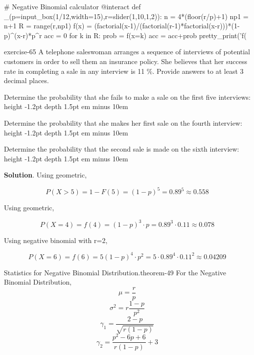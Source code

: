 \documentclass[10pt,]{book}
\newcommand{\fillin}[1]{\leavevmode\leaders\vrule height -1.2pt depth 1.5pt \hskip #1em minus #1em \null}
\numberwithin{equation}{section}
\newcommand{\gt}{>}
\begin{document}
\begin{sageinput}
# Negative Binomial calculator
@interact
def _(p=input_box(1/12,width=15),r=slider(1,10,1,2)):
    n = 4*(floor(r/p)+1)
    np1 = n+1
    R = range(r,np1)
    f(x) = (factorial(x-1)/(factorial(r-1)*factorial(x-r)))*(1-p)^(x-r)*p^r
    acc = 0
    for k in R:
        prob = f(x=k)
        acc = acc+prob
        pretty_print('f(%
\end{sageinput}
%
\begin{inlineexercise}{}{exercise-65}%
\hypertarget{p-983}{}%
A telephone saleswoman arranges a sequence of interviews of potential customers in order to sell them an insurance policy. She believes that her success rate in completing a sale in any interview is 11 \%. Provide answers to at least 3 decimal places.%
\par
\hypertarget{p-984}{}%
Determine the probability that she fails to make a sale on the first five interviews:   \fillin{10}%
\par
\hypertarget{p-985}{}%
Determine the probability that she makes her first sale on the fourth interview:  \fillin{10}%
\par
\hypertarget{p-986}{}%
Determine the probability that the second sale is made on the sixth interview:  \fillin{10}%
\par\smallskip%
\noindent\textbf{Solution}.\hypertarget{solution-28}{}\quad%
\hypertarget{p-987}{}%
Using geometric,%
\par
\hypertarget{p-988}{}%
%
\begin{equation*}
P(X \gt 5) = 1 - F(5) = (1-p)^5 = 0.89^5 \approx 0.558
\end{equation*}
%
\par
\hypertarget{p-989}{}%
Using geometric,%
\par
\hypertarget{p-990}{}%
%
\begin{equation*}
P(X = 4) = f(4) = (1-p)^3 \cdot p = 0.89^3 \cdot 0.11 \approx 0.078
\end{equation*}
%
\par
\hypertarget{p-991}{}%
Using negative binomial with r=2,%
\par
\hypertarget{p-992}{}%
%
\begin{equation*}
P(X = 6) = f(6) = 5 (1-p)^4 \cdot p^2 = 5 \cdot 0.89^4 \cdot 0.11^2 \approx 0.04209
\end{equation*}
%
\end{inlineexercise}
\hypertarget{p-993}{}%
\begin{theorem}{Statistics for Negative Binomial Distribution.}{}{theorem-49}%
\hypertarget{NegativeBinomialStatistics}{}%
For the Negative Binomial Distribution,%
\begin{equation*}
\mu = \frac{r}{p}
\end{equation*}
%
\begin{equation*}
\sigma^2 = r \frac{1-p}{p^2}
\end{equation*}
%
\begin{equation*}
\gamma_1 = \frac{2-p}{\sqrt{r(1-p)}}
\end{equation*}
%
\begin{equation*}
\gamma_2 = \frac{p^2-6p+6}{r(1-p)} + 3
\end{equation*}
%
\end{theorem}
\end{document}
